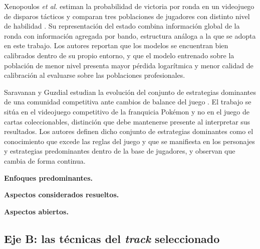 
Xenopoulos \textit{et al.} estiman la probabilidad de victoria por ronda en
un videojuego de disparos tácticos y comparan tres poblaciones de jugadores
con distinto nivel de habilidad \cite{xenopoulos_winprob_2022}. Su
representación del estado combina información global de la ronda con
información agregada por bando, estructura análoga a la que se adopta en
este trabajo. Los autores reportan que los modelos se encuentran bien
calibrados dentro de su propio entorno, y que el modelo entrenado sobre la
población de menor nivel presenta mayor pérdida logarítmica y menor
calidad de calibración al evaluarse sobre las poblaciones profesionales.

Saravanan y Guzdial estudian la evolución del conjunto de estrategias
dominantes de una comunidad competitiva ante cambios de balance del juego
\cite{saravanan_metadiscovery_2024}. El trabajo se sitúa en el videojuego
competitivo de la franquicia Pok\'emon y no en el juego de cartas
coleccionables, distinción que debe mantenerse presente al interpretar sus
resultados. Los autores definen dicho conjunto de estrategias dominantes
como el conocimiento que excede las reglas del juego y que se manifiesta en
los personajes y estrategias predominantes dentro de la base de jugadores,
y observan que cambia de forma continua.


\noindent\textbf{Enfoques predominantes.} 

\noindent\textbf{Aspectos considerados resueltos.} 

\noindent\textbf{Aspectos abiertos.} 

\subsection{Eje B: las técnicas del \textit{track} seleccionado}
\label{subsec:ejeb}

